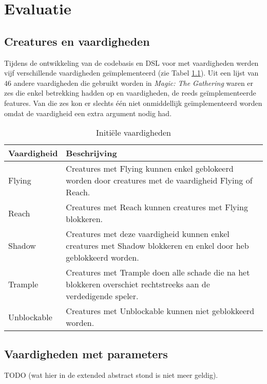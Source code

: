 \chapter{Evaluatie}

\section{Creatures en vaardigheden}
Tijdens de ontwikkeling van de codebasis en DSL voor  met vaardigheden werden vijf verschillende vaardigheden ge\"implementeerd (zie Tabel \ref{table:Vaardigheden}). Uit een lijst van $46$ andere vaardigheden die gebruikt worden in \textit{Magic: The Gathering} \cite{magic-abilities} waren er zes die enkel betrekking hadden op  en vaardigheden, de reeds ge\"implementeerde features. Van die zes kon er slechts \'e\'en niet onmiddellijk ge\"implementeerd worden omdat de vaardigheid een extra argument nodig had.
\begin{table}[h]
\caption{Initi\"ele vaardigheden}
\label{table:Vaardigheden}
\begin{tabular}{|l|p{}|}
\hline
Vaardigheid & Beschrijving \\ \hline
Flying & Creatures met Flying kunnen enkel geblokeerd worden door creatures met de vaardigheid Flying of Reach. \\
Reach & Creatures met Reach kunnen creatures met Flying blokkeren. \\
Shadow & Creatures met deze vaardigheid kunnen enkel creatures met Shadow blokkeren en enkel door heb geblokkeerd worden. \\
Trample & Creatures met Trample doen alle schade die na het blokkeren overschiet rechtstreeks aan de verdedigende speler. \\
Unblockable & Creatures met Unblockable kunnen niet geblokkeerd worden. \\
\hline
\end{tabular}
\end{table}

\section{Vaardigheden met parameters}
TODO (wat hier in de extended abstract stond is niet meer geldig).

